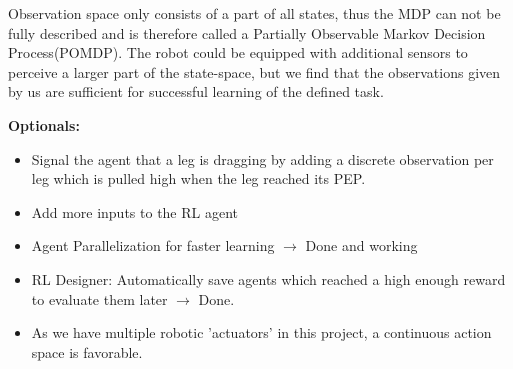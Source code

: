 Observation space only consists of a part of all states, thus the MDP can not be fully described and is therefore called a Partially Observable Markov Decision Process(POMDP).
The robot could be equipped with additional sensors to perceive a larger part of the state-space, but we find that the observations given by us are sufficient for successful learning of the defined task.


\cite{lillicrap2015continuous}





\textbf{Optionals:}

\begin{itemize}
	\item Signal the agent that a leg is dragging by adding a discrete observation per leg which is pulled high when the leg reached its PEP.
	
	\item Add more inputs to the RL agent
	
	\item Agent Parallelization for faster learning $\rightarrow$ Done and working
	
	\item RL Designer: Automatically save agents which reached a high enough reward to evaluate them later $\rightarrow$ Done.
	
	\item As we have multiple robotic 'actuators' in this project, a continuous action space is favorable.
	
\end{itemize}




